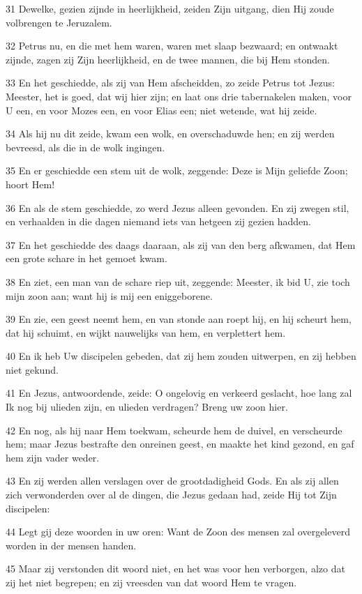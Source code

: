 \par 31 Dewelke, gezien zijnde in heerlijkheid, zeiden Zijn uitgang, dien Hij zoude volbrengen te Jeruzalem.
\par 32 Petrus nu, en die met hem waren, waren met slaap bezwaard; en ontwaakt zijnde, zagen zij Zijn heerlijkheid, en de twee mannen, die bij Hem stonden.
\par 33 En het geschiedde, als zij van Hem afscheidden, zo zeide Petrus tot Jezus: Meester, het is goed, dat wij hier zijn; en laat ons drie tabernakelen maken, voor U een, en voor Mozes een, en voor Elias een; niet wetende, wat hij zeide.
\par 34 Als hij nu dit zeide, kwam een wolk, en overschaduwde hen; en zij werden bevreesd, als die in de wolk ingingen.
\par 35 En er geschiedde een stem uit de wolk, zeggende: Deze is Mijn geliefde Zoon; hoort Hem!
\par 36 En als de stem geschiedde, zo werd Jezus alleen gevonden. En zij zwegen stil, en verhaalden in die dagen niemand iets van hetgeen zij gezien hadden.
\par 37 En het geschiedde des daags daaraan, als zij van den berg afkwamen, dat Hem een grote schare in het gemoet kwam.
\par 38 En ziet, een man van de schare riep uit, zeggende: Meester, ik bid U, zie toch mijn zoon aan; want hij is mij een eniggeborene.
\par 39 En zie, een geest neemt hem, en van stonde aan roept hij, en hij scheurt hem, dat hij schuimt, en wijkt nauwelijks van hem, en verplettert hem.
\par 40 En ik heb Uw discipelen gebeden, dat zij hem zouden uitwerpen, en zij hebben niet gekund.
\par 41 En Jezus, antwoordende, zeide: O ongelovig en verkeerd geslacht, hoe lang zal Ik nog bij ulieden zijn, en ulieden verdragen? Breng uw zoon hier.
\par 42 En nog, als hij naar Hem toekwam, scheurde hem de duivel, en verscheurde hem; maar Jezus bestrafte den onreinen geest, en maakte het kind gezond, en gaf hem zijn vader weder.
\par 43 En zij werden allen verslagen over de grootdadigheid Gods. En als zij allen zich verwonderden over al de dingen, die Jezus gedaan had, zeide Hij tot Zijn discipelen:
\par 44 Legt gij deze woorden in uw oren: Want de Zoon des mensen zal overgeleverd worden in der mensen handen.
\par 45 Maar zij verstonden dit woord niet, en het was voor hen verborgen, alzo dat zij het niet begrepen; en zij vreesden van dat woord Hem te vragen.
